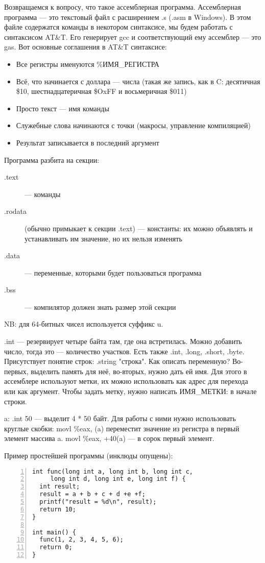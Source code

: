\documentclass[main]{subfiles}
\begin{document}
Возвращаемся к вопросу, что такое ассемблерная программа.
Ассемблерная программа --- это текстовый файл с расширением .s (.asm в Windows).
В этом файле содержатся команды в некотором синтаксисе, мы будем
работать с синтаксисом AT\&T. Его генерирует gcc и соответствующий ему
ассемблер --- это gas. Вот основные соглашения в AT\&T синтаксисе: 
\begin{itemize}
\item Все регистры именуются \%ИМЯ\_РЕГИСТРА
\item Всё, что начинается с доллара --- числа (такая же запись, как в C: десятичная
\$10, шестнадцатеричная \$OxFF и восьмеричная \$011)
\item Просто текст --- имя команды
\item Служебные слова начинаются с точки (макросы, управление компиляцией)
\item Результат записывается в последний аргумент
\end{itemize}

Программа разбита на секции:
\begin{description}
\item[.text] --- команды
\item[.rodata] (обычно примыкает к секции .text) --- константы: их
можно объявлять и устанавливать им значение, но их нельзя изменять
\item[.data] --- переменные, которыми будет пользоваться программа
\item[.bss] --- компилятор должен знать размер этой секции
\end{description}

NB: для 64-битных чисел используется суффикс u.

.int --- резервирует четыре байта там, где она встретилась.
Можно добавить число, тогда это --- количество участков.  Есть
также .int, .long, .short, .byte. Присутствует понятие строк:
.string "строка". Как описать переменную? Во-первых, выделить память для неё,
во-вторых, нужно дать ей имя. Для этого в ассемблере используют метки,
их можно использовать как адрес для перехода или как аргумент.
Чтобы задать метку, нужно написать ИМЯ\_МЕТКИ: в начале строки.

a: .int 50 --- выделит 4 * 50 байт.
Для работы с ними нужно использовать круглые скобки:
movl \%eax, (a) переместит значение из регистра в первый элемент массива a.
movl \%eax, +40(a) --- в сорок первый элемент.

Пример простейшей программы (инклюды опущены):
\begin{lstlisting}[numbers=left]
int func(long int a, long int b, long int c,
	 long int d, long int e, long int f) {
  int result;
  result = a + b + c + d +e +f;
  printf("result = %d\n", result);
  return 10;
}

int main() {
  func(1, 2, 3, 4, 5, 6);
  return 0;
}
\end{lstlisting}
\end{document}
